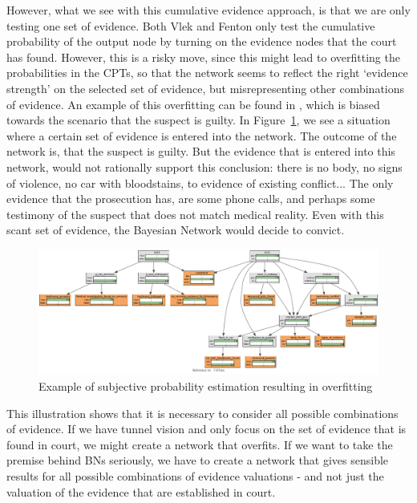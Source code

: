 However, what we see with this cumulative evidence approach, is that we are only testing one set of evidence. Both Vlek and Fenton only test the cumulative probability of the output node by turning on the evidence nodes that the court has found. However, this is a risky move, since this might lead to overfitting the probabilities in the CPTs, so that the network seems to reflect the right `evidence strength' on the selected set of evidence, but misrepresenting other combinations of evidence. An example of this overfitting can be found in \citep{vanLeeuwen2019}, which is biased towards the scenario that the suspect is guilty. In Figure~\ref{love}, we see a situation where a certain set of evidence is entered into the network. The outcome of the network is, that the suspect is guilty. But the evidence that is entered into this network, would not rationally support this conclusion: there is no body, no signs of violence, no car with bloodstains, to evidence of existing conflict... The only evidence that the prosecution has, are some phone calls, and perhaps some testimony of the suspect that does not match medical reality. Even with this scant set of evidence, the Bayesian Network would decide to convict.

\begin{figure}[htbp]
\includegraphics[width=\linewidth]{images/oldnetwork.pdf}
\caption{Example of subjective probability estimation resulting in overfitting}
\label{love}
\end{figure}%

This illustration shows that it is necessary to consider all possible combinations of evidence. If we have tunnel vision and only focus on the set of evidence that is found in court, we might create a network that overfits. If we want to take the premise behind BNs seriously, we have to create a network that gives sensible results for all possible combinations of evidence valuations - and not just the valuation of the evidence that are established in court.






